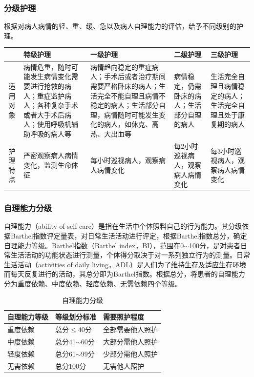 \documentclass[11pt, a4paper]{ctexart}
\begin{document}
\subsubsection{分级护理}
根据对病人病情的轻、重、缓、急以及病人自理能力的评估，给予不同级别的护理。
\begin{table}[htbp]
	\centering
	\small
	\renewcommand{\arraystretch}{1.5}
	\begin{tabularx}{\textwidth}{cXXXX}
		\toprule
		     & \textbf{特级护理}                                                & \textbf{一级护理}                                                                     & \textbf{二级护理}          & \textbf{三级护理}                  \\
		\midrule
		适用对象 & 病情危重，随时可能发生病情变化需要进行抢救的病人；重症监护病人；各种复杂手术或者大手术后病人；使用呼吸机辅助呼吸的病人等 & 病情趋向稳定的重症病人；手术后或者治疗期间需要严格卧床的病人；生活完全不能自理且病情不稳定的病人；生活部分自理，病情随时可能发生变化的病人，如休克、高热、大出血等 & 病情稳定，仍需卧床的病人；生活部分自理的病人 & 生活完全自理且病情稳定的病人；生活完全自理且处于康复期的病人 \\
		\addlinespace %
		护理特点 & 严密观察病人病情变化，监测生命体征                                            & 每小时巡视病人，观察病人病情变化                                                                  & 每2小时巡视病人，观察病人病情变化      & 每3小时巡视病人，观察病人病情变化              \\
		\bottomrule
	\end{tabularx}
\end{table}

\subsubsection{自理能力分级}
自理能力（ability of self-care）是指在生活中个体照料自己的行为能力。其分级依据Barthel指数评定量表，对日常生活活动进行评定，根据Barthel指数总分，确定自理能力等级。Barthel指数（Barthel index，BI），范围在0$\sim$100分，是对患者日常生活活动的功能状态进行测量，个体得分取决于对一系列独立行为的测量。日常生活活动（activities of daily living，ADL）是人们为了维持生存及适应生存环境而每天反复进行的活动，其总分即为Barthel指数。根据总分，将患者的自理能力分为重度依赖、中度依赖、轻度依赖、无需依赖四个等级。
\begin{table}[htbp]
	\centering
	\caption{自理能力分级}
	\begin{tabular}{|l|l|l|}
		\hline
		\textbf{自理能力等级} & \textbf{等级划分标准} & \textbf{需要照护程度} \\
		\hline
		重度依赖            & 总分$\leq$40分     & 全部需要他人照护        \\
		中度依赖            & 总分41$\sim$60分   & 大部分需他人照护        \\
		轻度依赖            & 总分61$\sim$99分   & 少部分需他人照护        \\
		无需依赖            & 总分100分          & 无需他人照护          \\
		\hline
	\end{tabular}
\end{table}
\end{document}
